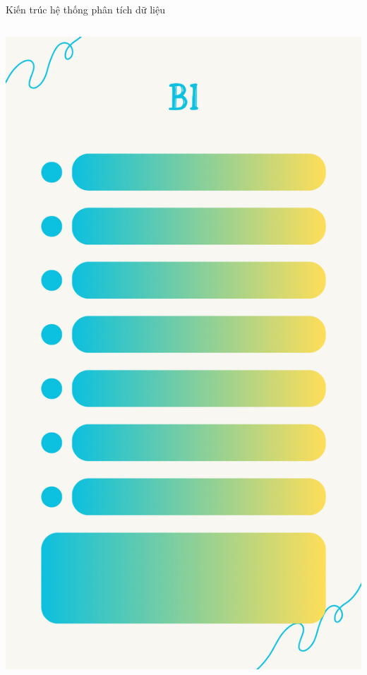 \documentclass{beamer}
\begin{document}
\begin{frame}{Kiến trúc hệ thống phân tích dữ liệu}
\begin{columns}
\begin{column}{0.24\textwidth}
\includegraphics[width=\textwidth]{pictures/BI.png}
\end{column}

\end{columns}
\end{frame}
\end{document}
